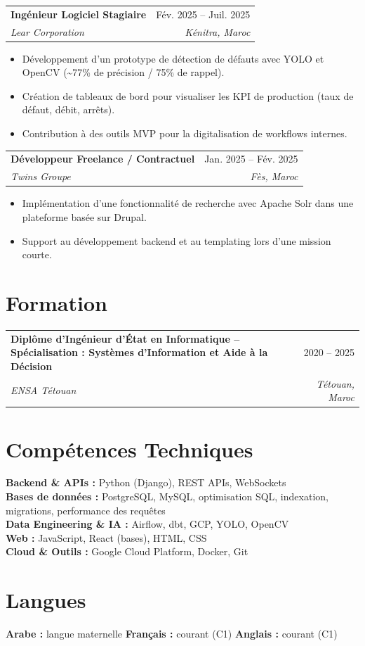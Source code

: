 \documentclass[11pt,a4paper]{article}
\makeatletter
\newcommand{\resumeEntry}[4]{
\begin{tabularx}{\textwidth}{@{}Xr@{}}
\textbf{#1} & #2 \\
\textit{#3} & \textit{#4} \\
\end{tabularx}
\vspace{-3pt}
}
\makeatother
\begin{document}
\resumeEntry
{Ingénieur Logiciel Stagiaire}
{Fév. 2025 -- Juil. 2025}
{Lear Corporation}
{Kénitra, Maroc}
\begin{itemize}
  \item Développement d’un prototype de détection de défauts avec YOLO et OpenCV (\textasciitilde77\% de précision / 75\% de rappel).
  \item Création de tableaux de bord pour visualiser les KPI de production (taux de défaut, débit, arrêts).
  \item Contribution à des outils MVP pour la digitalisation de workflows internes.
\end{itemize}

\resumeEntry
{Développeur Freelance / Contractuel}
{Jan. 2025 -- Fév. 2025}
{Twins Groupe}
{Fès, Maroc}
\begin{itemize}
  \item Implémentation d’une fonctionnalité de recherche avec Apache Solr dans une plateforme basée sur Drupal.
  \item Support au développement backend et au templating lors d’une mission courte.
\end{itemize}

\section*{Formation}
\resumeEntry
{Diplôme d’Ingénieur d’État en Informatique -- Spécialisation : Systèmes d’Information et Aide à la Décision}
{2020 -- 2025}
{ENSA Tétouan}
{Tétouan, Maroc}

\section*{Compétences Techniques}
\textbf{Backend \& APIs :} Python (Django), REST APIs, WebSockets \\
\textbf{Bases de données :} PostgreSQL, MySQL, optimisation SQL, indexation, migrations, performance des requêtes \\
\textbf{Data Engineering \& IA :} Airflow, dbt, GCP, YOLO, OpenCV \\
\textbf{Web :} JavaScript, React (bases), HTML, CSS \\
\textbf{Cloud \& Outils :} Google Cloud Platform, Docker, Git

\section*{Langues}
\textbf{Arabe :} langue maternelle \quad \textbf{Français :} courant (C1) \quad \textbf{Anglais :} courant (C1)
\end{document}
